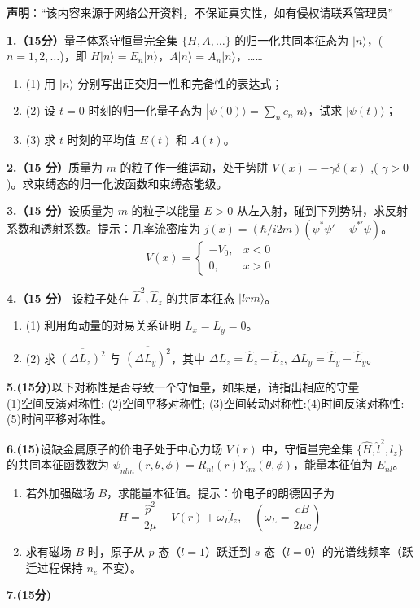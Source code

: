 
\textbf{声明}：“该内容来源于网络公开资料，不保证真实性，如有侵权请联系管理员”

\textbf{1.（15分）}量子体系守恒量完全集 $\{H, A, \dots\}$ 的归一化共同本征态为 $|n\rangle$，($n=1, 2, \dots$)，即 $H|n\rangle = E_n|n\rangle$，$A|n\rangle = A_n|n\rangle$，……
\begin{enumerate}
    \item (1) 用 $|n\rangle$ 分别写出正交归一性和完备性的表达式；
    \item (2) 设 $t=0$ 时刻的归一化量子态为 $|\psi(0)\rangle = \sum_n c_n |n\rangle$，试求 $|\psi(t)\rangle$；
    \item (3) 求 $t$ 时刻的平均值 $E(t)$ 和 $A(t)$。
\end{enumerate}
\textbf{2.（15 分）}质量为 $m$ 的粒子作一维运动，处于势阱 $V(x) = -\gamma \delta(x)$ ,( $\gamma > 0$ )。求束缚态的归一化波函数和束缚态能级。

\textbf{3.（15 分）}设质量为 $m$ 的粒子以能量 $E > 0$ 从左入射，碰到下列势阱，求反射系数和透射系数。提示：几率流密度为 $j(x) =(\hbar/i2m)(\psi^*\psi'  - \psi^{*'}\psi)$。
$$V(x) = \begin{cases} 
-V_0, & x < 0 \\ 
0, & x > 0 
\end{cases}~$$

\textbf{4.（15 分）}
设粒子处在 $\hat L^2,\hat L_z$ 的共同本征态 $|lrm\rangle$。

\begin{enumerate}
    \item (1) 利用角动量的对易关系证明 $L_x = L_y = 0$。
    \item (2) 求 $\overline{(\Delta L_z)^2}$ 与 $\overline{(\Delta L_y)^2}$，其中 $\Delta L_z = \hat L_z -\hat L_z $, $\Delta L_y = \hat L_y -\hat L_y$。
\end{enumerate}

\textbf{5.(15分)}以下对称性是否导致一个守恒量，如果是，请指出相应的守量\\
(1)空间反演对称性: (2)空间平移对称性; (3)空间转动对称性:(4)时间反演对称性:(5)时间平移对称性。

\textbf{6.(15)}设缺金属原子的价电子处于中心力场 $V(r)$ 中，守恒量完全集 $\{\hat H, \hat{l}^2, l_z\}$ 的共同本征函数数为 $\psi_{nlm}(r, \theta, \phi) = R_{nl}(r)Y_{lm}(\theta, \phi)$，能量本征值为 $E_{nl}$。

\begin{enumerate}
    \item 若外加强磁场 $B$，求能量本征值。提示：价电子的朗德因子为
  $$H = \frac{\hat p^2}{2\mu} + V(r) + \omega_L \hat l_z, \quad (\omega_L = \frac{eB}{2\mu c})~$$
    \item 求有磁场 $B$ 时，原子从 $p$ 态（$l = 1$）跃迁到 $s$ 态（$l = 0$）的光谱线频率（跃迁过程保持 $n_e$ 不变）。
\end{enumerate}

\textbf{7.(15分)}